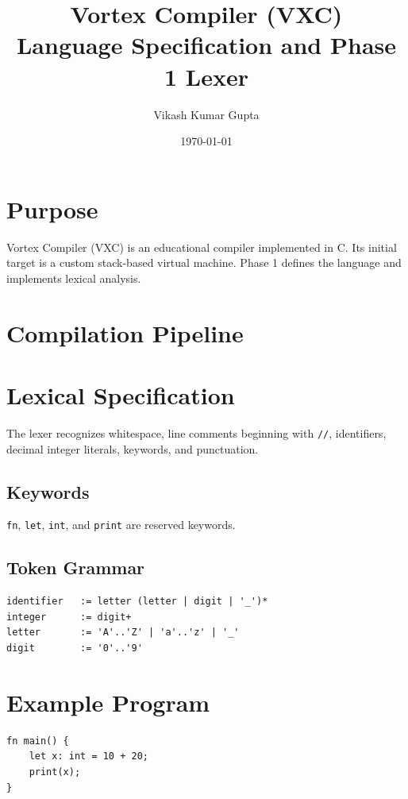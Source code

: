 \documentclass[11pt,a4paper]{article}
\title{Vortex Compiler (VXC)\\Language Specification and Phase 1 Lexer}
\author{Vikash Kumar Gupta}
\date{\today}
\begin{document}
\maketitle
\section{Purpose}
Vortex Compiler (VXC) is an educational compiler implemented in C. Its initial target is a custom stack-based virtual machine. Phase 1 defines the language and implements lexical analysis.
\section{Compilation Pipeline}
\begin{center}
\end{center}
\section{Lexical Specification}
The lexer recognizes whitespace, line comments beginning with \texttt{//}, identifiers, decimal integer literals, keywords, and punctuation.
\subsection{Keywords}
\texttt{fn}, \texttt{let}, \texttt{int}, and \texttt{print} are reserved keywords.
\subsection{Token Grammar}
\begin{lstlisting}
identifier   := letter (letter | digit | '_')*
integer      := digit+
letter       := 'A'..'Z' | 'a'..'z' | '_'
digit        := '0'..'9'
\end{lstlisting}
\section{Example Program}
\begin{lstlisting}
fn main() {
    let x: int = 10 + 20;
    print(x);
}
\end{lstlisting}
\end{document}
